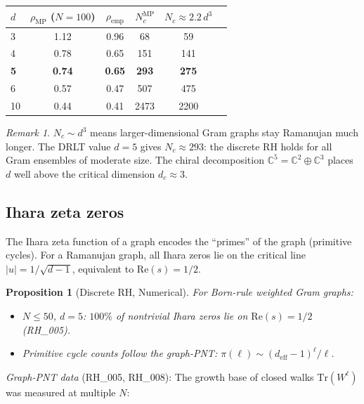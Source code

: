 \documentclass[12pt]{article}
\newtheorem{proposition}[theorem]{Proposition}
\theoremstyle{definition}
\theoremstyle{remark}
\newtheorem{remark}[theorem]{Remark}
\newcommand{\CC}{\mathbb{C}}
\begin{document}
\begin{center}
\begin{tabular}{lccccc}
\toprule
$d$ & $\rho_{\mathrm{MP}}$ ($N{=}100$) & $\rho_{\mathrm{emp}}$ &
  $N_c^{\mathrm{MP}}$ & $N_c \approx 2.2\,d^{3}$ \\
\midrule
3 & 1.12 & 0.96 & 68  & 59 \\
4 & 0.78 & 0.65 & 151 & 141 \\
\textbf{5} & \textbf{0.74} & \textbf{0.65} &
  \textbf{293} & \textbf{275} \\
6 & 0.57 & 0.47 & 507 & 475 \\
10 & 0.44 & 0.41 & 2473 & 2200 \\
\bottomrule
\end{tabular}
\end{center}

\begin{remark}
$N_c \sim d^3$ means larger-dimensional Gram graphs stay Ramanujan
much longer.
The DRLT value $d = 5$ gives $N_c \approx 293$: the
discrete RH holds for all Gram ensembles of moderate size.
The chiral decomposition $\CC^5 = \CC^2 \oplus \CC^3$ places
$d$ well above the critical dimension $d_c \approx 3$.
\end{remark}

\subsection{Ihara zeta zeros}

The Ihara zeta function of a graph encodes the ``primes'' of
the graph (primitive cycles).
For a Ramanujan graph, all Ihara zeros lie on the
critical line $|u| = 1/\sqrt{d-1}$, equivalent to
$\mathrm{Re}(s) = 1/2$.

\begin{proposition}[Discrete RH, Numerical]\label{prop:dRH}
For Born-rule weighted Gram graphs:
\begin{itemize}
\item $N \leq 50$, $d = 5$: $100\%$ of nontrivial Ihara zeros
  lie on $\mathrm{Re}(s) = 1/2$ (RH\_005).
\item Primitive cycle counts follow the graph-PNT:
  $\pi(\ell) \sim (d_{\mathrm{eff}}-1)^\ell / \ell$.
\end{itemize}
\end{proposition}

\emph{Graph-PNT data} (RH\_005, RH\_008):
The growth base of closed walks $\mathrm{Tr}(W^\ell)$ was measured
at multiple $N$:
\end{document}

